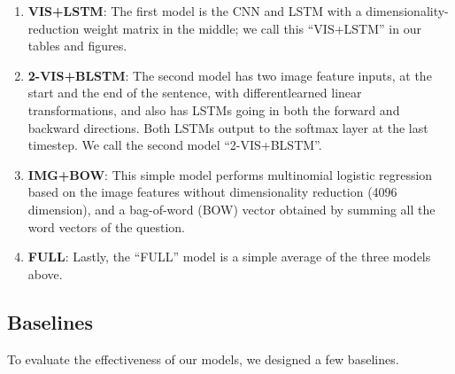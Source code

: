 \documentclass{article}
\renewcommand{\*}[1]{\textbf{#1}}
\begin{document}
\begin{enumerate}[leftmargin=*]
\item \*{VIS+LSTM}: The first model is the CNN and LSTM with a 
dimensionality-reduction weight matrix in the middle; we call this ``VIS+LSTM'' 
in our tables and figures. 
\item \*{2-VIS+BLSTM}: The second model has two image feature inputs, at the 
start and the end of the sentence, with differentlearned linear 
transformations, and also has LSTMs going in both the forward and backward 
directions. Both LSTMs output to the softmax layer at the last timestep. We 
call the second model ``2-VIS+BLSTM''. 
\item \*{IMG+BOW}: This simple model performs multinomial logistic regression 
based on the image features without dimensionality reduction (4096 dimension), 
and a bag-of-word (BOW) vector obtained by summing all the word vectors of the 
question.
\item \*{FULL}: Lastly, the ``FULL'' model is a simple average of the three 
models above.
\end{enumerate}

\subsection{Baselines}
To evaluate the effectiveness of our models, we designed a few baselines. 
\end{document}
